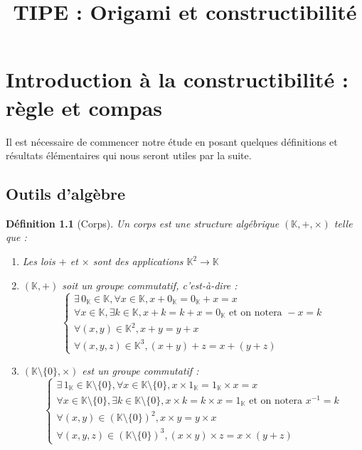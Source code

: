 \documentclass[a4paper,12pt,french,draft]{report}
\title{TIPE : Origami et constructibilité}
\newtheorem{definition}{Définition}[section]
\begin{document}
\maketitle
\renewcommand{\contentsname}{Sommaire}
\tableofcontents{}

\chapter{Introduction à la constructibilité : règle et compas}
		Il est nécessaire de commencer notre étude en posant quelques définitions et résultats élémentaires qui nous seront utiles par la suite.
		\section{Outils d'algèbre}
			
			\begin{definition}[Corps] 
				Un corps est une structure algébrique \( (\mathbb{K} , + , \times ) \) telle que :
				\begin{enumerate}
					\item Les lois \( + \) et \( \times \) sont des applications \( \mathbb{K}^2 \longrightarrow \mathbb{K} \)
					\item \((\mathbb{K} , +)\) soit un groupe commutatif, c'est-à-dire :
						\[ 
							\left\{ 
							\begin{array}{lll}
								\exists \, 0_{\mathbb{K}} \in \mathbb{K} , \forall x \in \mathbb{K}, x + 0_{\mathbb{K}} = 0_{\mathbb{K}} + x = x
								\\
								\forall x \in \mathbb{K} , \exists k \in \mathbb{K} , x + k = k + x = 0_{\mathbb{K}} \mbox{  et on notera } -x = k
								\\
								\forall (x,y) \in \mathbb{K}^{2},
											x + y = y + x
										
								\\
								\forall (x, y, z) \in \mathbb{K}^3, (x + y) + z = x + (y + z)
									 
							\end{array}
							\right.
						\]
					\item \((\mathbb{K}\setminus\{0\}, \times) \) est un groupe commutatif :
						\[ 
								\left\{ 
								\begin{array}{lll}
									\exists \, 1_{\mathbb{K}} \in \mathbb{K}\setminus\{0\} , \forall x \in \mathbb{K}\setminus\{0\}, x \times 1_{\mathbb{K}} = 1_{\mathbb{K}} \times x = x
									\\
									\forall x \in \mathbb{K}\setminus\{0\} , \exists k \in \mathbb{K}\setminus\{0\} , x \times k = k \times x = 1_{\mathbb{K}} \mbox{  et on notera } x^{-1} = k
									\\
									\forall (x,y) \in (\mathbb{K}\setminus\{0\})^{2},
												x \times y = y \times x
									\\
									\forall (x, y, z) \in (\mathbb{K}\setminus\{0\})^3, (x \times y) \times z = x \times (y + z)
										 

\end{array}\]
\end{enumerate}
\end{definition}
\end{document}
